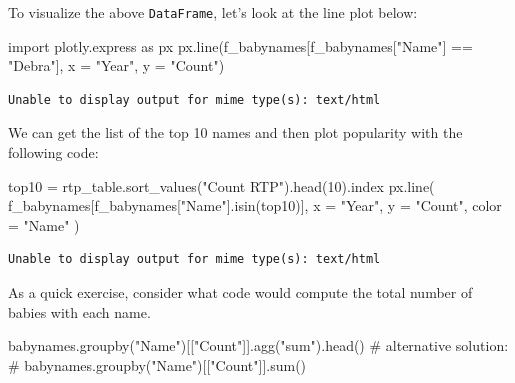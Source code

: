 \documentclass[
  letterpaper,
  DIV=11,
  numbers=noendperiod]{scrreprt}
\newenvironment{Shaded}{\begin{snugshade}}{\end{snugshade}}
\newcommand{\CommentTok}[1]{\textcolor[rgb]{0.37,0.37,0.37}{#1}}
\newcommand{\DecValTok}[1]{\textcolor[rgb]{0.68,0.00,0.00}{#1}}
\newcommand{\ImportTok}[1]{\textcolor[rgb]{0.00,0.46,0.62}{#1}}
\newcommand{\NormalTok}[1]{\textcolor[rgb]{0.00,0.23,0.31}{#1}}
\newcommand{\OperatorTok}[1]{\textcolor[rgb]{0.37,0.37,0.37}{#1}}
\newcommand{\StringTok}[1]{\textcolor[rgb]{0.13,0.47,0.30}{#1}}
\begin{document}
To visualize the above \texttt{DataFrame}, let's look at the line plot
below:

\begin{Shaded}
\begin{Highlighting}[]
\ImportTok{import}\NormalTok{ plotly.express }\ImportTok{as}\NormalTok{ px}
\NormalTok{px.line(f\_babynames[f\_babynames[}\StringTok{"Name"}\NormalTok{] }\OperatorTok{==} \StringTok{"Debra"}\NormalTok{], x }\OperatorTok{=} \StringTok{"Year"}\NormalTok{, y }\OperatorTok{=} \StringTok{"Count"}\NormalTok{)}
\end{Highlighting}
\end{Shaded}

\begin{verbatim}
Unable to display output for mime type(s): text/html
\end{verbatim}

We can get the list of the top 10 names and then plot popularity with
the following code:

\begin{Shaded}
\begin{Highlighting}[]
\NormalTok{top10 }\OperatorTok{=}\NormalTok{ rtp\_table.sort\_values(}\StringTok{"Count RTP"}\NormalTok{).head(}\DecValTok{10}\NormalTok{).index}
\NormalTok{px.line(}
\NormalTok{    f\_babynames[f\_babynames[}\StringTok{"Name"}\NormalTok{].isin(top10)], }
\NormalTok{    x }\OperatorTok{=} \StringTok{"Year"}\NormalTok{, }
\NormalTok{    y }\OperatorTok{=} \StringTok{"Count"}\NormalTok{, }
\NormalTok{    color }\OperatorTok{=} \StringTok{"Name"}
\NormalTok{)}
\end{Highlighting}
\end{Shaded}

\begin{verbatim}
Unable to display output for mime type(s): text/html
\end{verbatim}

As a quick exercise, consider what code would compute the total number
of babies with each name.

\begin{Shaded}
\begin{Highlighting}[]
\NormalTok{babynames.groupby(}\StringTok{"Name"}\NormalTok{)[[}\StringTok{"Count"}\NormalTok{]].agg(}\StringTok{"sum"}\NormalTok{).head()}
\CommentTok{\# alternative solution: }
\CommentTok{\# babynames.groupby("Name")[["Count"]].sum()}
\end{Highlighting}
\end{Shaded}
\end{document}
